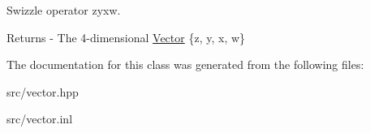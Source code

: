 Swizzle operator zyxw. \begin{DoxyReturn}{Returns}
-\/ The 4-\/dimensional \mbox{\hyperlink{class_vector}{Vector}} \{z, y, x, w\} 
\end{DoxyReturn}


The documentation for this class was generated from the following files\+:\begin{DoxyCompactItemize}
\item 
src/vector.\+hpp\item 
src/vector.\+inl\end{DoxyCompactItemize}
